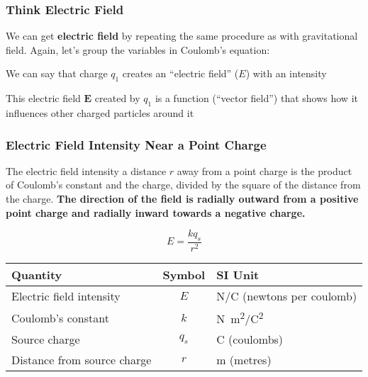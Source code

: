 \documentclass[12pt,aspectratio=169]{beamer}
\newcommand{\mb}[1]{\mathbf{#1}}
\begin{document}
\begin{frame}
  \frametitle{Think Electric Field}
  We can get \textbf{electric field} by repeating the same procedure as with
  gravitational field. Again, let's group the variables in Coulomb's equation:


  \vspace{-0.1in}
  We can say that charge $q_1$ creates an ``electric field'' ($E$) with an
  intensity


  \vspace{-0.1in}
  This electric field $\mb{E}$ created by $q_1$ is a function (``vector field'')
  that shows how it influences other charged particles around it
\end{frame}



\begin{frame}
  \frametitle{Electric Field Intensity Near a Point Charge}
  The electric field intensity a distance $r$ away from a point charge is
  the product of Coulomb's constant and the charge, divided by the square
  of the distance from the charge.
  \textbf{The direction of the field is radially outward from a positive
    point charge and radially inward towards a negative charge.}

  \vspace{-0.2in}
  {\Large
    \begin{displaymath}
      \boxed{E=\frac{kq_s}{r^2}}
    \end{displaymath}
  }
  \begin{center}
    \begin{tabular}{l|c|l}
      \rowcolor{pink}
      \textbf{Quantity} & \textbf{Symbol} & \textbf{SI Unit} \\ \hline
      Electric field intensity    & $E$   & \si{N/C} (newtons per coulomb)\\
      Coulomb's constant          & $k$   & \si{N.m^2/C^2} \\
      Source charge               & $q_s$ & \si{C} (coulombs) \\
      Distance from source charge & $r$   & \si{m} (metres)  \\
    \end{tabular}
  \end{center}
\end{frame}
\end{document}
